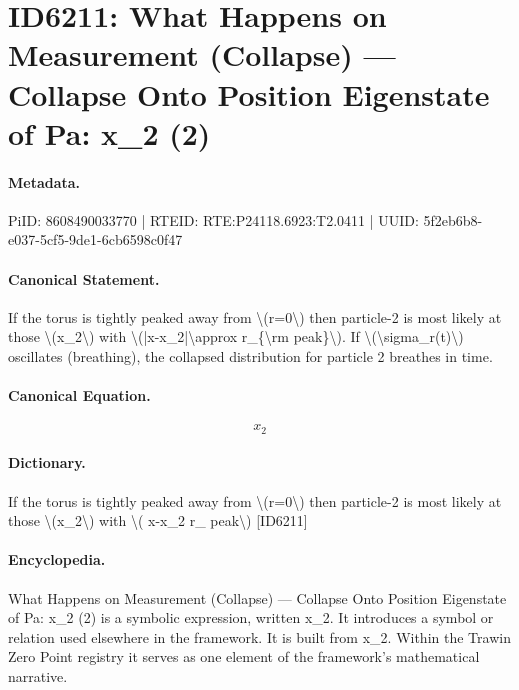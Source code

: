 \section*{ID6211: What Happens on Measurement (Collapse) — Collapse Onto Position Eigenstate of Pa: x\_2 (2)}
\paragraph{Metadata.}
PiID: 8608490033770 | RTEID: RTE:P24118.6923:T2.0411 | UUID: 5f2eb6b8-e037-5cf5-9de1-6cb6598c0f47

\paragraph{Canonical Statement.}
If the torus is tightly peaked away from \textbackslash{}(r=0\textbackslash{}) then particle-2 is most likely at those \textbackslash{}(x\_2\textbackslash{}) with \textbackslash{}(|x-x\_2|\textbackslash{}approx r\_\{\textbackslash{}rm peak\}\textbackslash{}). If \textbackslash{}(\textbackslash{}sigma\_r(t)\textbackslash{}) oscillates (breathing), the collapsed distribution for particle 2 breathes in time.

\paragraph{Canonical Equation.}
\[
x_2
\]

\paragraph{Dictionary.}
If the torus is tightly peaked away from \textbackslash{}(r=0\textbackslash{}) then particle-2 is most likely at those \textbackslash{}(x\_2\textbackslash{}) with \textbackslash{}( x-x\_2 r\_ peak\textbackslash{}) [ID6211]

\paragraph{Encyclopedia.}
What Happens on Measurement (Collapse) — Collapse Onto Position Eigenstate of Pa: x\_2 (2) is a symbolic expression, written x\_2. It introduces a symbol or relation used elsewhere in the framework. It is built from x\_2. Within the Trawin Zero Point registry it serves as one element of the framework's mathematical narrative.
